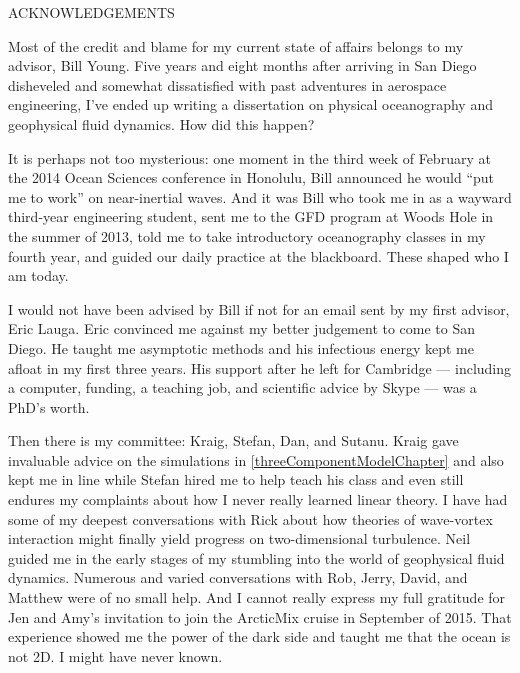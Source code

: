 \documentclass[12pt, oneside]{book}
\begin{document}
\clearpage {} {}
{\let\cleardoublepage\relax \listoftables}


\clearpage {} {}
\doublespacing
\begingroup
	\centering 
	ACKNOWLEDGEMENTS \medskip \par
\endgroup

Most of the credit and blame for my current state of affairs belongs to my advisor, Bill Young.  Five years and eight months after arriving in San Diego disheveled and somewhat dissatisfied with past adventures in aerospace engineering, I've ended up writing a dissertation on physical oceanography and geophysical fluid dynamics.  How did this happen?  

It is perhaps not too mysterious: one moment in the third week of February at the 2014 Ocean Sciences conference in Honolulu, Bill announced he would ``put me to work'' on near-inertial waves.  And it was Bill who took me in as a wayward third-year engineering student, sent me to the GFD program at Woods Hole in the summer of 2013, told me to take introductory oceanography classes in my fourth year, and guided our daily practice at the blackboard.  These shaped who I am today.

I would not have been advised by Bill if not for an email sent by my first advisor, Eric Lauga.  Eric convinced me against my better judgement to come to San Diego.  He taught me asymptotic methods and his infectious energy kept me afloat in my first three years.  His support after he left for Cambridge --- including a computer, funding, a teaching job, and scientific advice by Skype --- was a PhD's worth.  

Then there is my committee: Kraig, Stefan, Dan, and Sutanu.  Kraig gave invaluable advice on the simulations in \ch \ref{threeComponentModelChapter} and also kept me in line while Stefan hired me to help teach his class and even still endures my complaints about how I never really learned linear theory.  I have had some of my deepest conversations with Rick about how theories of wave-vortex interaction might finally yield progress on two-dimensional turbulence.  Neil guided me in the early stages of my stumbling into the world of geophysical fluid dynamics.  Numerous and varied conversations with Rob, Jerry, David, and Matthew were of no small help.  And I cannot really express my full gratitude for Jen and Amy's invitation to join the ArcticMix cruise in September of 2015.  That experience showed me the power of the dark side and taught me that the ocean is not 2D.  I might have never known.
\end{document}

